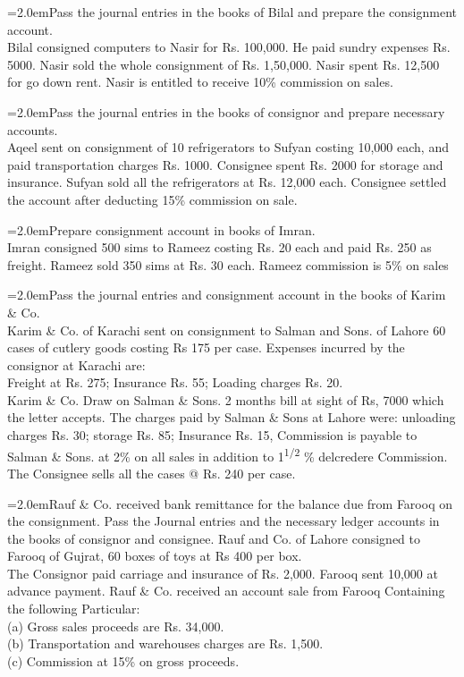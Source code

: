 \documentclass[11pt,a4paper]{article}
\newcommand{\lqn}[2]{\Needspace{6\baselineskip}\par\medskip\noindent\hangindent=2.0em\hangafter=1\makebox[2.0em][l]{\textbf{#1.}}#2\par}
\begin{document}
\lqn{30}{Pass the journal entries in the books of Bilal and prepare the consignment account.\\
Bilal consigned computers to Nasir for Rs. 100,000. He paid sundry expenses Rs. 5000. Nasir sold the whole consignment of Rs. 1,50,000. Nasir spent Rs. 12,500 for go down rent. Nasir is entitled to receive 10\% commission on sales.\par
}
\lqn{31}{Pass the journal entries in the books of consignor and prepare necessary accounts.\\
Aqeel sent on consignment of 10 refrigerators to Sufyan costing 10,000 each, and paid transportation charges Rs. 1000. Consignee spent Rs. 2000 for storage and insurance. Sufyan sold all the refrigerators at Rs. 12,000 each. Consignee settled the account after deducting 15\% commission on sale.\par
}
\lqn{32}{Prepare consignment account in books of Imran.\\
Imran consigned 500 sims to Rameez costing Rs. 20 each and paid Rs. 250 as freight. Rameez sold 350 sims at Rs. 30 each. Rameez commission is 5\% on sales\par
}
\lqn{33}{Pass the journal entries and consignment account in the books of Karim \& Co.\\
Karim \& Co. of Karachi sent on consignment to Salman and Sons. of Lahore 60 cases of cutlery goods costing Rs 175 per case. Expenses incurred by the consignor at Karachi are:\\
Freight at Rs. 275; Insurance Rs. 55; Loading charges Rs. 20.\\
Karim \& Co. Draw on Salman \& Sons. 2 months bill at sight of Rs, 7000 which the letter accepts. The charges paid by Salman \& Sons at Lahore were: unloading charges Rs. 30; storage Rs. 85; Insurance Rs. 15, Commission is payable to Salman \& Sons. at 2\% on all sales in addition to 1\textsuperscript{1/2} \% delcredere Commission.\\
The Consignee sells all the cases @ Rs. 240 per case.\par
}
\lqn{34}{Rauf \& Co. received bank remittance for the balance due from Farooq on the consignment. Pass the Journal entries and the necessary ledger accounts in the books of consignor and consignee. Rauf and Co. of Lahore consigned to Farooq of Gujrat, 60 boxes of toys at Rs 400 per box.\\
The Consignor paid carriage and insurance of Rs. 2,000. Farooq sent 10,000 at advance payment. Rauf \& Co. received an account sale from Farooq Containing the following Particular:\\
(a)  Gross sales proceeds are Rs. 34,000.\\
(b)  Transportation and warehouses charges are Rs. 1,500.\\
(c)  Commission at 15\% on gross proceeds.\par
}
\end{document}
